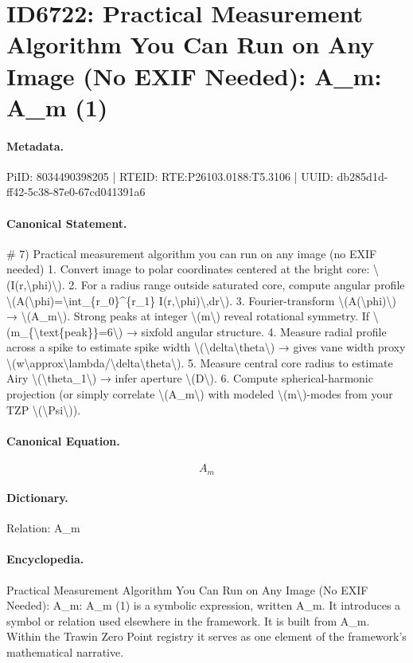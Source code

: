 \section*{ID6722: Practical Measurement Algorithm You Can Run on Any Image (No EXIF Needed): A\_m: A\_m (1)}
\paragraph{Metadata.}
PiID: 8034490398205 | RTEID: RTE:P26103.0188:T5.3106 | UUID: db285d1d-ff42-5c38-87e0-67cd041391a6

\paragraph{Canonical Statement.}
\# 7) Practical measurement algorithm you can run on any image (no EXIF needed) 1. Convert image to polar coordinates centered at the bright core: \textbackslash{}(I(r,\textbackslash{}phi)\textbackslash{}). 2. For a radius range outside saturated core, compute angular profile \textbackslash{}(A(\textbackslash{}phi)=\textbackslash{}int\_\{r\_0\}\textasciicircum{}\{r\_1\} I(r,\textbackslash{}phi)\textbackslash{},dr\textbackslash{}). 3. Fourier-transform \textbackslash{}(A(\textbackslash{}phi)\textbackslash{}) → \textbackslash{}(A\_m\textbackslash{}). Strong peaks at integer \textbackslash{}(m\textbackslash{}) reveal rotational symmetry. If \textbackslash{}(m\_\{\textbackslash{}text\{peak\}\}=6\textbackslash{}) → sixfold angular structure. 4. Measure radial profile across a spike to estimate spike width \textbackslash{}(\textbackslash{}delta\textbackslash{}theta\textbackslash{}) → gives vane width proxy \textbackslash{}(w\textbackslash{}approx\textbackslash{}lambda/\textbackslash{}delta\textbackslash{}theta\textbackslash{}). 5. Measure central core radius to estimate Airy \textbackslash{}(\textbackslash{}theta\_1\textbackslash{}) → infer aperture \textbackslash{}(D\textbackslash{}). 6. Compute spherical-harmonic projection (or simply correlate \textbackslash{}(A\_m\textbackslash{}) with modeled \textbackslash{}(m\textbackslash{})-modes from your TZP \textbackslash{}(\textbackslash{}Psi\textbackslash{})).

\paragraph{Canonical Equation.}
\[
A_m
\]

\paragraph{Dictionary.}
Relation: A\_m

\paragraph{Encyclopedia.}
Practical Measurement Algorithm You Can Run on Any Image (No EXIF Needed): A\_m: A\_m (1) is a symbolic expression, written A\_m. It introduces a symbol or relation used elsewhere in the framework. It is built from A\_m. Within the Trawin Zero Point registry it serves as one element of the framework's mathematical narrative.
